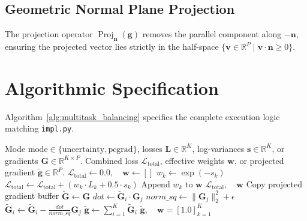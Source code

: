 \documentclass[11pt]{article}
\begin{document}
\subsection{Geometric Normal Plane Projection}
The projection operator $\operatorname{Proj}_{\mathbf{n}}(\mathbf{g})$ removes the parallel component along $-\mathbf{n}$, ensuring the projected vector lies strictly in the half-space $\{\mathbf{v} \in \mathbb{R}^P \mid \mathbf{v} \cdot \mathbf{n} \ge 0\}$.

\section{Algorithmic Specification}
\label{sec:algorithm}

Algorithm~\ref{alg:multitask_balancing} specifies the complete execution logic matching \texttt{impl.py}.

\begin{algorithm}[H]
\caption{Multi-Task Loss Balancing and PCGrad Conflict Orthogonalization}
\label{alg:multitask_balancing}
\begin{algorithmic}[1]
\Require Mode $\mathrm{mode} \in \{\text{uncertainty}, \text{pcgrad}\}$, losses $\mathbf{L} \in \mathbb{R}^K$, log-variances $\mathbf{s} \in \mathbb{R}^K$, or gradients $\mathbf{G} \in \mathbb{R}^{K \times P}$.
\Ensure Combined loss $\mathcal{L}_{\mathrm{total}}$, effective weights $\mathbf{w}$, or projected gradient $\tilde{\mathbf{g}} \in \mathbb{R}^P$.
    \State $\mathcal{L}_{\mathrm{total}} \gets 0.0, \quad \mathbf{w} \gets []$
        \State $w_k \gets \exp(-s_k)$
        \State $\mathcal{L}_{\mathrm{total}} \gets \mathcal{L}_{\mathrm{total}} + (w_k \cdot L_k + 0.5 \cdot s_k)$
        \State Append $w_k$ to $\mathbf{w}$
    \EndFor
    \State \Return $\mathcal{L}_{\mathrm{total}}, \quad \mathbf{w}$
\Else
    \State Copy projected gradient buffer $\tilde{\mathbf{G}} \gets \mathbf{G}$
                \State $dot \gets \tilde{\mathbf{G}}_i \cdot \mathbf{G}_j$
                    \State $norm\_sq \gets \|\mathbf{G}_j\|_2^2 + \epsilon$
                    \State $\tilde{\mathbf{G}}_i \gets \tilde{\mathbf{G}}_i - \frac{dot}{norm\_sq} \mathbf{G}_j$
                \EndIf
            \EndIf
        \EndFor
    \EndFor
    \State $\tilde{\mathbf{g}} \gets \sum_{i=1}^K \tilde{\mathbf{G}}_i$
    \State \Return $\tilde{\mathbf{g}}, \quad \mathbf{w} = [1.0]_{k=1}^K$
\EndIf
\end{algorithmic}
\end{algorithm}
\end{document}
